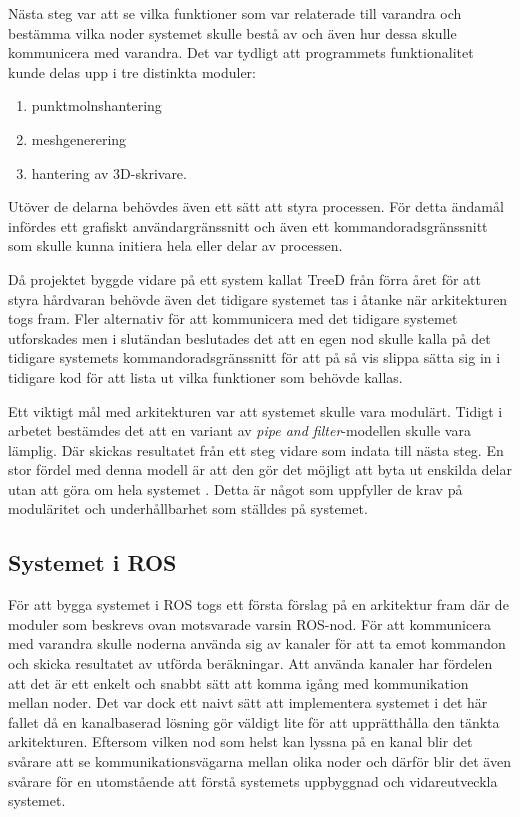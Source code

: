 Nästa steg var att se vilka funktioner som var relaterade till varandra och bestämma vilka noder systemet skulle bestå av och även hur dessa skulle kommunicera med varandra. Det var tydligt att programmets funktionalitet kunde delas upp i tre distinkta moduler:

\begin{enumerate}
	\item punktmolnshantering
	
	\item meshgenerering
	
	\item hantering av 3D-skrivare.
\end{enumerate}

Utöver de delarna behövdes även ett sätt att styra processen. För detta ändamål infördes ett grafiskt användargränssnitt och även ett kommandoradsgränssnitt som skulle kunna initiera hela eller delar av processen.

Då projektet byggde vidare på ett system kallat TreeD från förra året för att styra hårdvaran behövde även det tidigare systemet tas i åtanke när arkitekturen togs fram. Fler alternativ för att kommunicera med det tidigare systemet utforskades men i slutändan beslutades det att en egen nod skulle kalla på det tidigare systemets kommandoradsgränssnitt för att på så vis slippa sätta sig in i tidigare kod för att lista ut vilka funktioner som behövde kallas.

Ett viktigt mål med arkitekturen var att systemet skulle vara modulärt. Tidigt i arbetet bestämdes det att en variant av \textit{pipe and filter}-modellen skulle vara lämplig. Där skickas resultatet från ett steg vidare som indata till nästa steg. En stor fördel med denna modell är att den gör det möjligt att byta ut enskilda delar utan att göra om hela systemet \cite{garlan1993introduction}. Detta är något som uppfyller de krav på moduläritet och underhållbarhet som ställdes på systemet.

\subsection{Systemet i ROS}
För att bygga systemet i ROS togs ett första förslag på en arkitektur fram där de moduler som beskrevs ovan motsvarade varsin ROS-nod. För att kommunicera med varandra skulle noderna använda sig av kanaler för att ta emot kommandon och skicka resultatet av utförda beräkningar. Att använda kanaler har fördelen att det är ett enkelt och snabbt sätt att komma igång med kommunikation mellan noder. Det var dock ett naivt sätt att implementera systemet i det här fallet då en kanalbaserad lösning gör väldigt lite för att upprätthålla den tänkta arkitekturen. Eftersom vilken nod som helst kan lyssna på en kanal blir det svårare att se kommunikationsvägarna mellan olika noder och därför blir det även svårare för en utomstående att förstå systemets uppbyggnad och vidareutveckla systemet.

